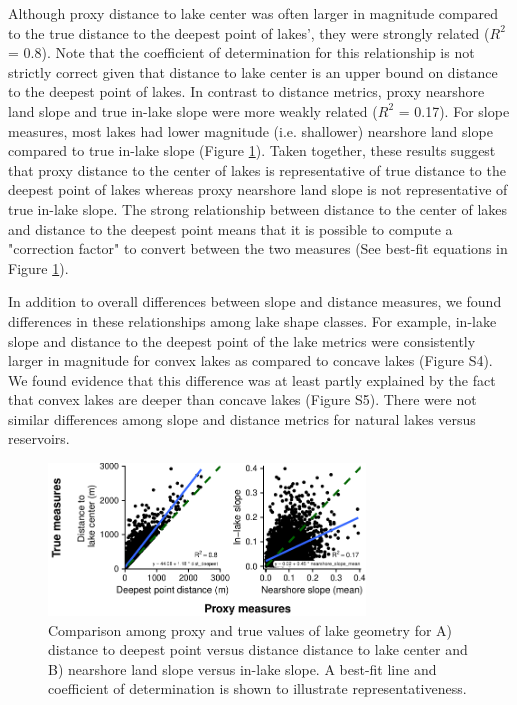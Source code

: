 \documentclass[draft]{agujournal2019}
\begin{document}
Although proxy distance to lake center was often larger in magnitude compared to the true distance to the deepest point of lakes’, they were strongly related ($R^2$ = 0.8). Note that the coefficient of determination for this relationship is not strictly correct given that distance to lake center is an upper bound on distance to the deepest point of lakes. In contrast to distance metrics, proxy nearshore land slope and true in-lake slope were more weakly related ($R^2$ = 0.17). For slope measures, most lakes had lower magnitude (i.e. shallower) nearshore land slope compared to true in-lake slope (Figure \ref{fig2}). Taken together, these results suggest that proxy distance to the center of lakes is representative of true distance to the deepest point of lakes whereas proxy nearshore land slope is not representative of true in-lake slope. The strong relationship between distance to the center of lakes and distance to the deepest point means that it is possible to compute a "correction factor" to convert between the two measures (See best-fit equations in Figure \ref{fig2}).

In addition to overall differences between slope and distance measures, we found differences in these relationships among lake shape classes. For example, in-lake slope and distance to the deepest point of the lake metrics were consistently larger in magnitude for convex lakes as compared to concave lakes (Figure S4). We found evidence that this difference was at least partly explained by the fact that convex lakes are deeper than concave lakes (Figure S5). There were not similar differences among slope and distance metrics for natural lakes versus reservoirs.

\begin{figure}
  \begin{center}
    \includegraphics[width=0.75\textwidth,keepaspectratio]{../figures/01_geometry_base-1}
  \end{center}
  \caption{Comparison among proxy and true values of lake geometry for A) distance to deepest point versus distance distance to lake center and B) nearshore land slope versus in-lake slope. A best-fit line and coefficient of determination is shown to illustrate representativeness.}\label{fig2}
\end{figure}
\end{document}
